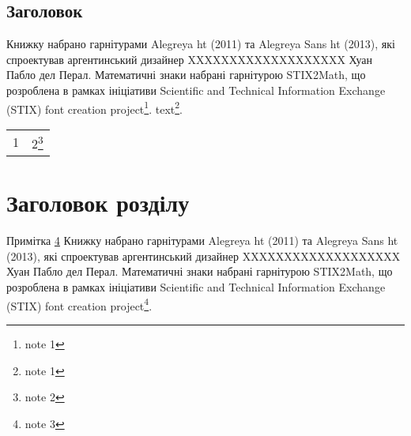 \documentclass{kapital}
\begin{document}
\subsection[Заголовок]{Заголовок\footnotemark{}}

Книжку набрано гарнітурами Alegreya ht (2011) та Alegreya Sans ht (2013), які спроектував аргентинський дизайнер XXXXXXXXXXXXXXXXXXX Хуан Пабло дел Перал. Математичні знаки набрані гарнітурою STIX2Math, що розроблена в рамках ініціативи Scientific and Technical Information Exchange (STIX) font creation project\footnote{note 1}. text\footnote*{note 1}.

\begin{tabularx}{10em}{Xl}
1 & 2\footnote{note 2}
\end{tabularx}

\section{Заголовок розділу}
Примітка \ref{footnote_1} Книжку набрано гарнітурами Alegreya ht (2011) та Alegreya Sans ht (2013), які спроектував аргентинський дизайнер XXXXXXXXXXXXXXXXXXX Хуан Пабло дел Перал. Математичні знаки набрані гарнітурою STIX2Math, що розроблена в рамках ініціативи Scientific and Technical Information Exchange (STIX) font creation project\footnote{\label{footnote_1}note 3}. 


\end{document}
